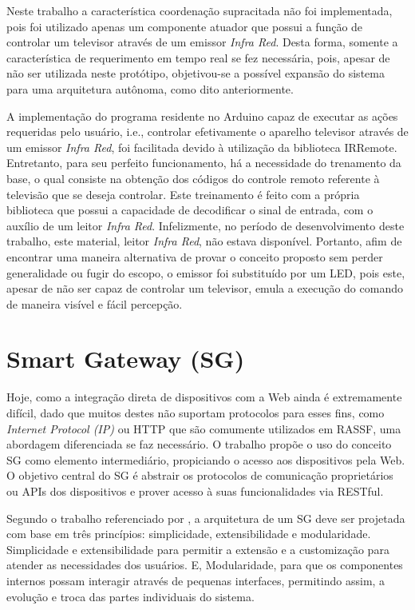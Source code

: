 \documentclass[12pt,a4paper,oneside]{report}
\begin{document}
Neste trabalho a característica coordenação supracitada não foi implementada, pois foi utilizado apenas um componente atuador que possui a função de controlar um televisor através de um emissor \emph{Infra Red}. Desta forma, somente a característica de requerimento em tempo real se fez necessária, pois, apesar de não ser utilizada neste protótipo, objetivou-se a possível expansão do sistema para uma arquitetura autônoma, como dito anteriormente.

A implementação do programa residente no Arduino capaz de executar as ações requeridas pelo usuário, i.e., controlar efetivamente o aparelho televisor através de um emissor \emph{Infra Red}, foi facilitada devido à utilização da biblioteca IRRemote. Entretanto, para seu perfeito funcionamento, há a necessidade do trenamento da base, o qual consiste na obtenção dos códigos do controle remoto referente à televisão que se deseja controlar. Este treinamento é feito com a própria biblioteca que possui a capacidade de decodificar o sinal de entrada, com o auxílio de um leitor \emph{Infra Red}. Infelizmente, no período de desenvolvimento deste trabalho, este material, leitor \emph{Infra Red}, não estava disponível. Portanto, afim de encontrar uma maneira alternativa de provar o conceito proposto sem perder generalidade ou fugir do escopo, o emissor foi substituído por um LED, pois este, apesar de não ser capaz de controlar um televisor, emula a execução do comando de maneira visível e fácil percepção.

\section{Smart Gateway (SG)}
\label{sec:sg}

Hoje, como a integração direta de dispositivos com a Web ainda é extremamente difícil, dado que muitos destes não suportam protocolos para esses fins, como \emph{Internet Protocol (IP)} ou HTTP que são comumente utilizados em RASSF, uma abordagem diferenciada se faz necessário. O trabalho \cite{wotdovad} propõe o uso do conceito SG como elemento intermediário, propiciando o acesso aos dispositivos pela Web. O objetivo central do SG é abstrair os protocolos de comunicação proprietários ou APIs dos dispositivos e prover acesso à suas funcionalidades via RESTful.

Segundo o trabalho referenciado por \cite{sgtriwiguiboh}, a arquitetura de um SG deve ser projetada com base em três princípios: simplicidade, extensibilidade e modularidade. Simplicidade e extensibilidade para permitir a extensão e a customização para atender as necessidades dos usuários. E, Modularidade, para que os componentes internos possam interagir através de pequenas interfaces, permitindo assim, a evolução e troca das partes individuais do sistema.
\end{document}
